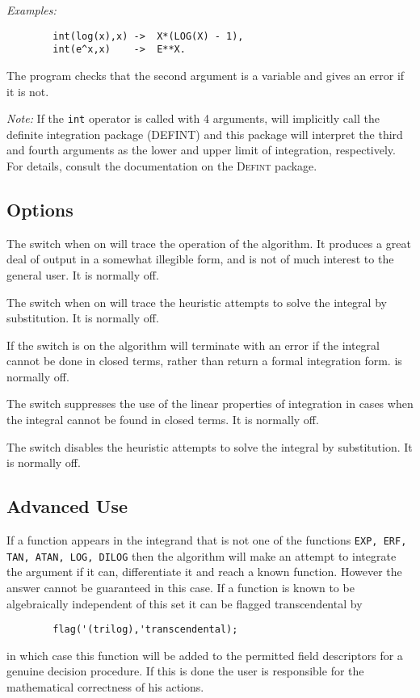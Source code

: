 \textit{Examples:}
\begin{verbatim}
        int(log(x),x) ->  X*(LOG(X) - 1),
        int(e^x,x)    ->  E**X.
\end{verbatim}
The program checks that the second argument is a variable and gives an
error if it is not.

\textit{Note:} If the \texttt{int} operator is called with 4 arguments,
{\REDUCE} will implicitly call the definite integration package (DEFINT)
and this package will interpret the third and fourth arguments as the lower
and upper limit of integration, respectively.  For details, consult
the documentation on the \textsc{Defint} package.


\subsection{Options}
\hypertarget{switch:TRINT}{}
\hypertarget{switch:TRINTSUBST}{}
\hypertarget{switch:FAILHARD}{}
\hypertarget{switch:NOLNR}{}
\hypertarget{switch:NOINTSUBST}{}

The switch  when on will trace the operation of the algorithm. It
produces a great deal of output in a somewhat illegible form, and is not
of much interest to the general user. It is normally off.

The switch  when on will trace the heuristic attempts to
solve the integral by substitution. It is normally off.

If the switch  is on the algorithm will terminate with an
error if the integral cannot be done in closed terms, rather than return a
formal integration form.  is normally off.

The switch  suppresses the use of the linear properties of
integration in cases when the integral cannot be found in closed terms.
It is normally off.

The switch  disables the heuristic attempts to solve
the integral by substitution. It is normally off.

\subsection{Advanced Use}
\hypertarget{operator:ERF}{}

If a function appears in the integrand that is not one of the functions
\texttt{EXP, ERF, TAN, ATAN, LOG, DILOG}
then the algorithm will make an
attempt to integrate the argument if it can, differentiate it and reach a
known function.  However the answer cannot be guaranteed in this case.  If
a function is known to be algebraically independent of this set it can be
flagged transcendental by
\begin{verbatim}
        flag('(trilog),'transcendental);
\end{verbatim}
in which case this function will be added to the permitted field
descriptors for a genuine decision procedure. If this is done the user is
responsible for the mathematical correctness of his actions.

